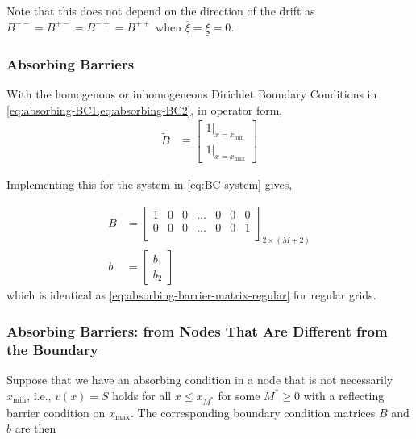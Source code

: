 \documentclass[11pt]{article}
\theoremstyle{definition}
\begin{document}
Note that this does not depend on the direction of the drift as $B^{--} = B^{+-} = B^{-+} = B^{++}$ when $\overline{\xi} = \underline{\xi} = 0$.

\subsubsection{Absorbing Barriers}

With the homogenous or inhomogeneous Dirichlet Boundary Conditions in \cref{eq:absorbing-BC1,eq:absorbing-BC2}, in operator form,
\begin{align}
\tilde{B} &\equiv \begin{bmatrix}
1 \vert_{x = x_{\min}}\\
1 \vert_{x = x_{\max}}
\end{bmatrix}
\end{align}

Implementing this for the system in \cref{eq:BC-system} gives,

\begin{align}
B &= \begin{bmatrix}
1 & 0 & 0 & \dots & 0 & 0 & 0 \\
0 & 0 & 0 & \dots & 0 & 0 & 1\\
\end{bmatrix}_{2 \times (M+2)}\\
b &= \begin{bmatrix}
b_1 \\
b_2
\end{bmatrix}
\end{align}
which is identical as \eqref{eq:absorbing-barrier-matrix-regular} for regular grids.

\subsubsection{Absorbing Barriers: from Nodes That Are Different from the Boundary}
Suppose that we have an absorbing condition in a node that is not necessarily $x_{\min}$, i.e., $v(x) = S$ holds for all $x \leq x_{M^*}$ for some $M^* \geq 0$ with a reflecting barrier condition on $x_{\max}$. The corresponding boundary condition matrices $B$ and $b$ are then
\end{document}
